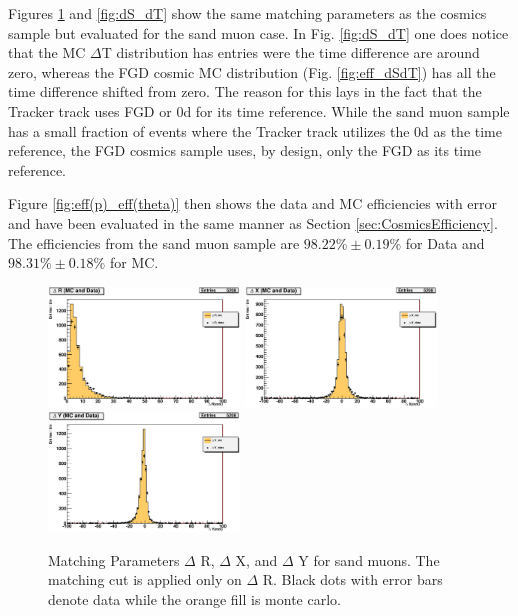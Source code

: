 Figures \ref{fig:dRetcSM} and \ref{fig:dS_dT} show 
the same matching parameters as the cosmics sample 
but evaluated for the sand muon case. 
{\color{red}
In Fig. \ref{fig:dS_dT} one does notice that the MC $\Delta$T 
distribution 
has entries were the time difference are around zero, 
whereas the FGD cosmic MC distribution (Fig. \ref{fig:eff_dSdT})
has all the time difference shifted from zero. 
The reason for this 
lays in the fact that the 
Tracker track uses FGD or \p0d for its time reference.
While the sand muon sample has a small fraction of 
events where the Tracker track utilizes the \p0d as the time reference, 
the FGD cosmics sample uses, by design, only the FGD as 
its time reference.\\
}

Figure \ref{fig:eff(p)_eff(theta)} then shows 
the data and MC efficiencies with error 
and have been evaluated in the same manner 
as Section \ref{sec:CosmicsEfficiency}. 
The efficiencies from the sand muon sample 
are $98.22\%\pm 0.19\%$ for Data and $98.31\%\pm 0.18\%$ for MC.

\begin{figure}
\centering
\includegraphics[width=2in]{Figures/Systematics/SandMuonEfficiencyPlots/C_34.eps}
\includegraphics[width=2in]{Figures/Systematics/SandMuonEfficiencyPlots/C_35.eps}
\includegraphics[width=2in]{Figures/Systematics/SandMuonEfficiencyPlots/C_36.eps}
\caption{Matching Parameters $\Delta$ R, $\Delta$ X, and $\Delta$ Y 
for sand muons. 
The matching cut is applied only on $\Delta$ R. 
Black dots with error bars denote data while the orange fill is monte carlo.}
\label{fig:dRetcSM}
\end{figure}


